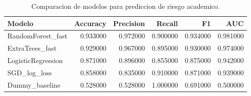 \begin{table}
\caption{Comparacion de modelos para prediccion de riesgo academico.}
\label{tab:ml_comp_real}
\begin{tabular}{lrrrrr}
\toprule
Modelo & Accuracy & Precision & Recall & F1 & AUC \\
\midrule
RandomForest\_fast & 0.933000 & 0.972000 & 0.900000 & 0.934000 & 0.981000 \\
ExtraTrees\_fast & 0.929000 & 0.967000 & 0.895000 & 0.930000 & 0.974000 \\
LogisticRegression & 0.871000 & 0.896000 & 0.855000 & 0.875000 & 0.942000 \\
SGD\_log\_loss & 0.858000 & 0.835000 & 0.910000 & 0.871000 & 0.939000 \\
Dummy\_baseline & 0.528000 & 0.528000 & 1.000000 & 0.691000 & 0.500000 \\
\bottomrule
\end{tabular}
\end{table}
